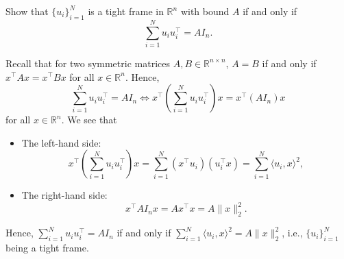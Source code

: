 \begin{problem*}[Exercise 3.3.9]\label{ex3.3.9}
	Show that \(\{ u_i \} _{i = 1}^N\) is a tight frame in \(\mathbb{R} ^n\) with bound \(A\) if and only if
	\[
		\sum_{i=1}^{N} u_i u_i ^{\top}
		= A I_n.
	\]
\end{problem*}
\begin{answer}
	Recall that for two symmetric matrices \(A, B \in \mathbb{R} ^{n\times n}\), \(A = B\) if and only if \(x^{\top} A x = x^{\top} B x\) for all \(x\in \mathbb{R} ^n\). Hence,
	\[
		\sum_{i=1}^{N} u_i u_i ^{\top} = A I_n \iff
		x^{\top} \left( \sum_{i=1}^{N} u_i u_i ^{\top} \right) x = x ^{\top} (A I_n) x
	\]
	for all \(x \in \mathbb{R} ^n\). We see that
	\begin{itemize}
		\item The left-hand side:
		      \[
			      x^{\top} \left( \sum_{i=1}^{N} u_i u_i ^{\top} \right) x
			      = \sum_{i=1}^{N} (x^{\top} u_i) (u_i ^{\top} x)
			      = \sum_{i=1}^{N} \langle u_i, x \rangle ^2,
		      \]
		\item The right-hand side:
		      \[
			      x^{\top} A I_n x
			      = A x^{\top} x
			      = A \lVert x \rVert _2^2.
		      \]
	\end{itemize}
	Hence, \(\sum_{i=1}^{N} u_i u_i ^{\top} = AI_n\) if and only if \(\sum_{i=1}^{N} \langle u_i , x \rangle ^2 = A \lVert x \rVert _2^2\), i.e., \(\{ u_i \} _{i=1}^N\) being a tight frame.
\end{answer}